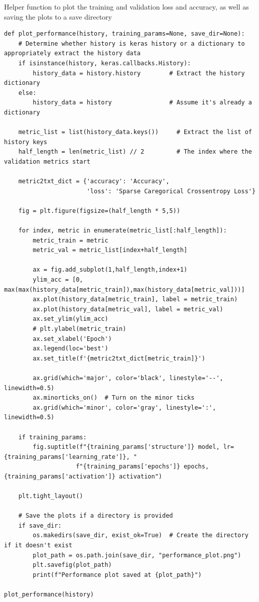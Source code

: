 \documentclass[a4paper]{article}
\begin{document}
Helper function to plot the training and validation loss and accuracy, as well as saving the plots to a save directory

\begin{lstlisting}
def plot_performance(history, training_params=None, save_dir=None):
    # Determine whether history is keras history or a dictionary to appropriately extract the history data
    if isinstance(history, keras.callbacks.History):
        history_data = history.history        # Extract the history dictionary
    else:
        history_data = history                # Assume it's already a dictionary

    metric_list = list(history_data.keys())     # Extract the list of history keys
    half_length = len(metric_list) // 2         # The index where the validation metrics start

    metric2txt_dict = {'accuracy': 'Accuracy',
                       'loss': 'Sparse Caregorical Crossentropy Loss'}

    fig = plt.figure(figsize=(half_length * 5,5))

    for index, metric in enumerate(metric_list[:half_length]):
        metric_train = metric
        metric_val = metric_list[index+half_length]

        ax = fig.add_subplot(1,half_length,index+1)
        ylim_acc = [0, max(max(history_data[metric_train]),max(history_data[metric_val]))]
        ax.plot(history_data[metric_train], label = metric_train)
        ax.plot(history_data[metric_val], label = metric_val)
        ax.set_ylim(ylim_acc)
        # plt.ylabel(metric_train)
        ax.set_xlabel('Epoch')
        ax.legend(loc='best')
        ax.set_title(f'{metric2txt_dict[metric_train]}')

        ax.grid(which='major', color='black', linestyle='--', linewidth=0.5)
        ax.minorticks_on()  # Turn on the minor ticks
        ax.grid(which='minor', color='gray', linestyle=':', linewidth=0.5)
        
    if training_params:
        fig.suptitle(f"{training_params['structure']} model, lr={training_params['learning_rate']}, "
                    f"{training_params['epochs']} epochs, {training_params['activation']} activation")

    plt.tight_layout()
    
    # Save the plots if a directory is provided
    if save_dir:
        os.makedirs(save_dir, exist_ok=True)  # Create the directory if it doesn't exist
        plot_path = os.path.join(save_dir, "performance_plot.png")
        plt.savefig(plot_path)
        print(f"Performance plot saved at {plot_path}")

plot_performance(history)
\end{lstlisting}
\end{document}
